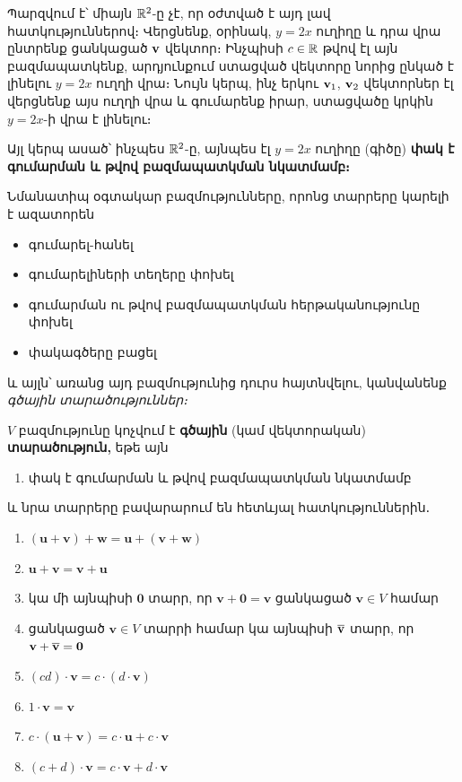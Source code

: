 Պարզվում է՝ միայն $\mathbb{R}^2$-ը չէ, որ օժտված է այդ լավ հատկություններով։ Վերցնենք, օրինակ, $y=2x$ ուղիղը և դրա վրա ընտրենք ցանկացած $\mathbf{v}$ վեկտոր։ Ինչպիսի $c\in \mathbb{R}$ թվով էլ այն բազմապատկենք, արդյունքում ստացված վեկտորը նորից ընկած է լինելու $y=2x$ ուղղի վրա։ Նույն կերպ, ինչ երկու $\mathbf{v}_1$, $\mathbf{v}_2$ վեկտորներ էլ վերցնենք այս ուղղի վրա և գումարենք իրար, ստացվածը կրկին $y=2x$-ի վրա է լինելու։ 

Այլ կերպ ասած՝ ինչպես $\mathbb{R}^2$-ը, այնպես էլ $y=2x$ ուղիղը (գիծը) \textbf{փակ է գումարման և թվով բազմապատկման նկատմամբ։} 


Նմանատիպ օգտակար բազմությունները, որոնց տարրերը կարելի է ազատորեն
\begin{itemize}
    \item գումարել-հանել
    \item գումարելիների տեղերը փոխել
    \item գումարման ու թվով բազմապատկման հերթականությունը փոխել
    \item փակագծերը բացել
\end{itemize}
և այլն՝ առանց այդ բազմությունից դուրս հայտնվելու, կանվանենք \textit{գծային տարածություններ։} 

\begin{definition}
$V$ բազմությունը կոչվում է \textbf{գծային} (կամ վեկտո\-րա\-կան) \textbf{տարածություն,} եթե այն
\begin{enumerate}
\item փակ է գումարման և թվով բազմապատկման նկատմամբ
\end{enumerate}
և նրա տարրերը բավարարում են հետևյալ հատկություններին․
\begin{enumerate}[resume]
  \item \( (\mathbf{u} + \mathbf{v}) + \mathbf{w} = \mathbf{u} + (\mathbf{v} + \mathbf{w}) \)
  \item \( \mathbf{u} + \mathbf{v} = \mathbf{v} + \mathbf{u} \)
  \item կա մի այնպիսի \( \mathbf{0} \) տարր, որ \( \mathbf{v} + \mathbf{0} = \mathbf{v} \) ցանկացած \( \mathbf{v} \in V \) համար
  \item ցանկացած \( \mathbf{v} \in V \) տարրի համար կա այնպիսի \( \overline{\mathbf{v}} \) տարր, որ \( \mathbf{v} + \overline{\mathbf{v}} = \mathbf{0} \)
  \item \( (cd) \cdot \mathbf{v} = c \cdot (d \cdot \mathbf{v}) \)
  \item \( 1 \cdot \mathbf{v} = \mathbf{v} \)
  \item \( c \cdot (\mathbf{u} + \mathbf{v}) = c \cdot \mathbf{u} + c \cdot \mathbf{v} \)
  \item \( (c + d) \cdot \mathbf{v} = c \cdot \mathbf{v} + d \cdot \mathbf{v} \)
\end{enumerate}
\end{definition}

